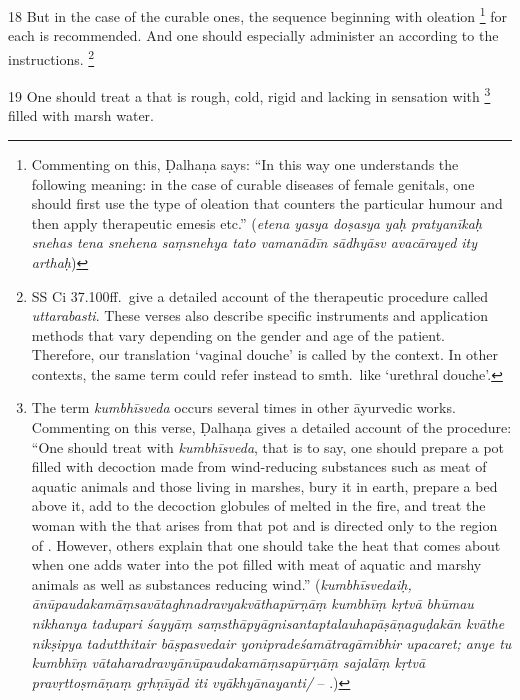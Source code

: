\begin{translation}
\item [18]
But in the case of the curable ones, the sequence beginning with oleation%
	\footnote{%
	Commenting on this, Ḍalhaṇa says: “In this way one understands the following meaning: in the case of curable diseases of female genitals, one should first use the type of oleation that counters the particular humour and then apply therapeutic emesis etc.”
	(\textit{etena yasya doṣasya yaḥ pratyanīkaḥ snehas tena snehena saṃsnehya tato vamanādīn sādhyāsv avacārayed ity arthaḥ})
	} 
for each  is recommended.
And one should especially administer an  according to the instructions.%
	\footnote{%
	SS Ci 37.100ff.\ give a detailed account of the therapeutic procedure called \textit{uttarabasti}. These verses also describe specific instruments and application methods that vary depending on the gender and age of the patient. Therefore, our translation ‘vaginal douche’ is called by the context. In other contexts, the same term could refer instead to smth.\ like ‘urethral douche’.
	}

\item [19]
One should treat a   that is rough, cold, rigid and lacking in sensation with %
	\footnote{%
	The term \textit{kumbhīsveda} occurs several times in other āyurvedic works. 
	Commenting on this verse, Ḍalhaṇa gives a detailed account of the procedure: 
		``One should treat with \textit{kumbhīsveda}, that is to say, one should 
		prepare a pot filled with decoction made from wind-reducing substances 
		such as meat of aquatic animals and those living in marshes, bury it in earth, 
		prepare a bed above it, add to the decoction globules of 
		 melted in the fire, and treat the woman 
		with the  that arises from that pot and is directed 
		only to the region of . However, others explain 
		that one should take the heat that comes about when one adds water into 
		the pot filled with meat of aquatic and marshy animals as well as substances 
		reducing wind.''
	 		(\textit{kumbhīsvedaiḥ, ānūpaudakamāṃsavātaghnadravyakvāthapūrṇāṃ 
	 		kumbhīṃ kṛtvā bhūmau nikhanya tadupari śayyāṃ 
	 		saṃsthāpyāgnisantaptalauhapāṣāṇaguḍakān kvāthe nikṣipya tadutthitair 
	 		bāṣpasvedair yonipradeśamātragāmibhir upacaret; anye tu kumbhīṃ 
	 		vātaharadravyānūpaudakamāṃsapūrṇāṃ sajalāṃ kṛtvā pravṛttoṣmāṇaṃ 
	 		gṛhṇīyād iti vyākhyānayanti/} -- .)
	} 
filled with marsh water. 


\end{translation}
